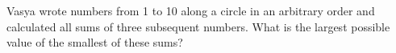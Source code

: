 \problem
Vasya wrote numbers from 1 to 10 along a circle in an arbitrary order and
calculated all sums of three subsequent numbers.
What is the largest possible value of the smallest of these sums?
\solution
\endproblem
